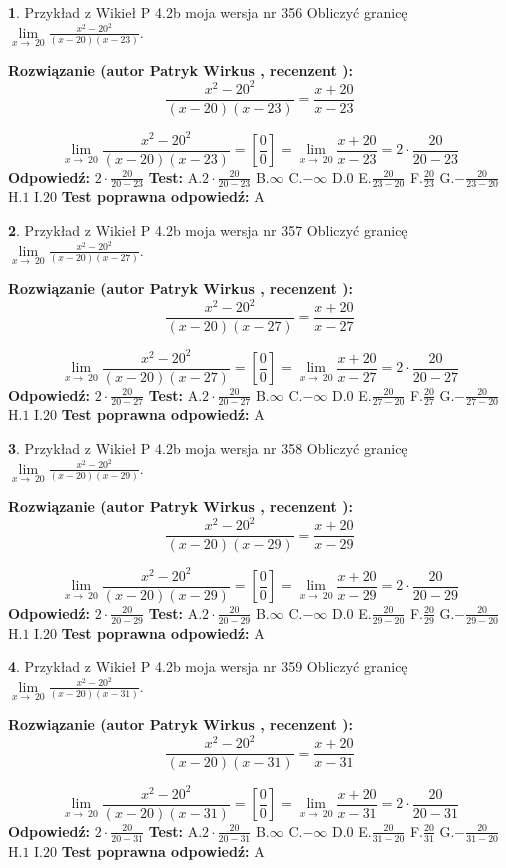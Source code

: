 \documentclass[12pt, a4paper]{article}
\theoremstyle{definition} %
\newtheorem{zad}{}
\newcommand{\zadStart}[1]{\begin{zad}#1\newline}
\newcommand{\zadStop}{\end{zad}}
\newcommand{\rozwStart}[2]{\noindent \textbf{Rozwiązanie (autor #1 , recenzent #2): }\newline}
\newcommand{\rozwStop}{\newline}
\newcommand{\odpStart}{\noindent \textbf{Odpowiedź:}\newline}
\newcommand{\odpStop}{\newline}
\newcommand{\testStart}{\noindent \textbf{Test:}\newline}
\newcommand{\testStop}{\newline}
\newcommand{\kluczStart}{\noindent \textbf{Test poprawna odpowiedź:}\newline}
\newcommand{\kluczStop}{\newline}
\begin{document}
\zadStart{Przykład z Wikieł P 4.2b moja wersja nr 356}
Obliczyć granicę $\lim\limits_{x\to\ 20}\frac{x^{2}-20^{2}}{(x-20)(x-23)}$.
\zadStop
\rozwStart{Patryk Wirkus}{}
$$\frac{x^{2}-20^{2}}{(x-20)(x-23)}=\frac{x+20}{x-23}$$

$$\lim\limits_{x\to\ 20}\frac{x^{2}-20^{2}}{(x-20)(x-23)}=[\frac{0}{0}]=\lim\limits_{x\to\ 20}\frac{x+20}{x-23}=2 \cdot \frac{20}{20-23}$$
\rozwStop
\odpStart
$2 \cdot \frac{20}{20-23}$
\odpStop
\testStart
A.$2 \cdot \frac{20}{20-23}$
B.$\infty$
C.$-\infty$
D.$0$
E.$\frac{20}{23-20}$
F.$\frac{20}{23}$
G.$-\frac{20}{23-20}$
H.$1$
I.$20$
\testStop
\kluczStart
A
\kluczStop



\zadStart{Przykład z Wikieł P 4.2b moja wersja nr 357}
Obliczyć granicę $\lim\limits_{x\to\ 20}\frac{x^{2}-20^{2}}{(x-20)(x-27)}$.
\zadStop
\rozwStart{Patryk Wirkus}{}
$$\frac{x^{2}-20^{2}}{(x-20)(x-27)}=\frac{x+20}{x-27}$$

$$\lim\limits_{x\to\ 20}\frac{x^{2}-20^{2}}{(x-20)(x-27)}=[\frac{0}{0}]=\lim\limits_{x\to\ 20}\frac{x+20}{x-27}=2 \cdot \frac{20}{20-27}$$
\rozwStop
\odpStart
$2 \cdot \frac{20}{20-27}$
\odpStop
\testStart
A.$2 \cdot \frac{20}{20-27}$
B.$\infty$
C.$-\infty$
D.$0$
E.$\frac{20}{27-20}$
F.$\frac{20}{27}$
G.$-\frac{20}{27-20}$
H.$1$
I.$20$
\testStop
\kluczStart
A
\kluczStop



\zadStart{Przykład z Wikieł P 4.2b moja wersja nr 358}
Obliczyć granicę $\lim\limits_{x\to\ 20}\frac{x^{2}-20^{2}}{(x-20)(x-29)}$.
\zadStop
\rozwStart{Patryk Wirkus}{}
$$\frac{x^{2}-20^{2}}{(x-20)(x-29)}=\frac{x+20}{x-29}$$

$$\lim\limits_{x\to\ 20}\frac{x^{2}-20^{2}}{(x-20)(x-29)}=[\frac{0}{0}]=\lim\limits_{x\to\ 20}\frac{x+20}{x-29}=2 \cdot \frac{20}{20-29}$$
\rozwStop
\odpStart
$2 \cdot \frac{20}{20-29}$
\odpStop
\testStart
A.$2 \cdot \frac{20}{20-29}$
B.$\infty$
C.$-\infty$
D.$0$
E.$\frac{20}{29-20}$
F.$\frac{20}{29}$
G.$-\frac{20}{29-20}$
H.$1$
I.$20$
\testStop
\kluczStart
A
\kluczStop



\zadStart{Przykład z Wikieł P 4.2b moja wersja nr 359}
Obliczyć granicę $\lim\limits_{x\to\ 20}\frac{x^{2}-20^{2}}{(x-20)(x-31)}$.
\zadStop
\rozwStart{Patryk Wirkus}{}
$$\frac{x^{2}-20^{2}}{(x-20)(x-31)}=\frac{x+20}{x-31}$$

$$\lim\limits_{x\to\ 20}\frac{x^{2}-20^{2}}{(x-20)(x-31)}=[\frac{0}{0}]=\lim\limits_{x\to\ 20}\frac{x+20}{x-31}=2 \cdot \frac{20}{20-31}$$
\rozwStop
\odpStart
$2 \cdot \frac{20}{20-31}$
\odpStop
\testStart
A.$2 \cdot \frac{20}{20-31}$
B.$\infty$
C.$-\infty$
D.$0$
E.$\frac{20}{31-20}$
F.$\frac{20}{31}$
G.$-\frac{20}{31-20}$
H.$1$
I.$20$
\testStop
\kluczStart
A
\kluczStop
\end{document}
